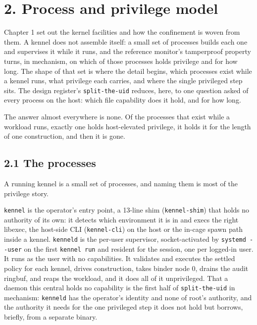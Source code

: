 \hypertarget{process-and-privilege-model}{%
\chapter{2. Process and privilege
model}\label{process-and-privilege-model}}

Chapter 1 set out the kernel facilities and how the confinement is woven
from them. A kennel does not assemble itself: a small set of processes
builds each one and supervises it while it runs, and the reference
monitor's tamperproof property turns, in mechanism, on which of those
processes holds privilege and for how long. The shape of that set is
where the detail begins, which processes exist while a kennel runs, what
privilege each carries, and where the single privileged step sits. The
design register's \texttt{split-the-uid} reduces, here, to one question
asked of every process on the host: which file capability does it hold,
and for how long.

The answer almost everywhere is none. Of the processes that exist while
a workload runs, exactly one holds host-elevated privilege, it holds it
for the length of one construction, and then it is gone.

\hypertarget{the-processes}{%
\section{2.1 The processes}\label{the-processes}}

A running kennel is a small set of processes, and naming them is most of
the privilege story.

\texttt{kennel} is the operator's entry point, a 13-line shim
(\texttt{kennel-shim}) that holds no authority of its own: it detects
which environment it is in and execs the right libexec, the host-side
CLI (\texttt{kennel-cli}) on the host or the in-cage spawn path inside a
kennel. \texttt{kenneld} is the per-user supervisor, socket-activated by
\texttt{systemd\ -\/-user} on the first \texttt{kennel\ run} and
resident for the session, one per logged-in user. It runs as the user
with no capabilities. It validates and executes the settled policy for
each kennel, drives construction, takes binder node 0, drains the audit
ringbuf, and reaps the workload, and it does all of it unprivileged.
That a daemon this central holds no capability is the first half of
\texttt{split-the-uid} in mechanism: \texttt{kenneld} has the operator's
identity and none of root's authority, and the authority it needs for
the one privileged step it does not hold but borrows, briefly, from a
separate binary.

